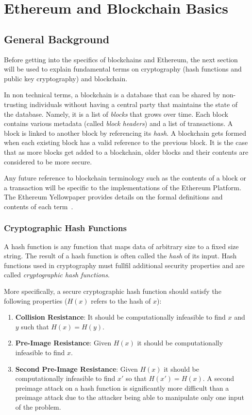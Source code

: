 \chapter{Ethereum and Blockchain Basics}\label{ch:basics}

\section{General Background}
Before getting into the specifics of blockchains and Ethereum, the next section will be used to explain fundamental terms on cryptography (hash functions and public key cryptography) and blockchain.

In non technical terms, a blockchain is a database that can be shared by non-trusting individuals without having a central party that maintains the state of the database. Namely, it is a list of \textit{blocks} that grows over time. Each block contains various metadata (called \textit{block headers}) and a list of transactions. A block is linked to another block by referencing its \textit{hash}. A blockchain gets formed when each existing block has a valid reference to the previous block. It is the case that as more blocks get added to a blockchain, older blocks and their contents are considered to be more secure.

Any future reference to blockchain terminology such as the contents of a block or a transaction will be specific to the implementations of the Ethereum Platform. The Ethereum Yellowpaper provides details on the formal definitions and contents of each term~\cite{ethereum}.

\subsection{Cryptographic Hash Functions}
A hash function is any function that maps data of arbitrary size to a fixed size string. The result of a hash function is often called the \textit{hash} of its input. Hash functions used in cryptography must fullfil additional security properties and are called \textit{cryptographic hash functions}.

More specifically, a secure cryptographic hash function should satisfy the following properties \cite{Rogaway04cryptographichash-function} (\(H(x)\) refers to the hash of $x$):
\begin{enumerate}
   \item \textbf{Collision Resistance}: It should be computationally infeasible to find $x$ and $y$ such that \(H(x) = H(y)\). 
   \item \textbf{Pre-Image Resistance}: Given \(H(x)\) it should be computationally infeasible to find \(x\).
   \item \textbf{Second Pre-Image Resistance}: Given \(H(x)\) it should be computationally infeasible to find \(x'\) so that \(H(x') = H(x)\). A second preimage attack on a hash function is significantly more difficult than a preimage attack due to the attacker being able to manipulate only one input of the problem. 
\end{enumerate}

